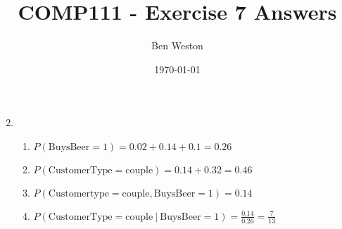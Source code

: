 \documentclass{article}
\title{COMP111 - Exercise 7 Answers}
\author{Ben Weston}
\date{\today}
\begin{document}
\maketitle
\begin{enumerate}\setcounter{enumi}{1}
        \item
                \begin{enumerate}
                        \item $P(\text{BuysBeer}=1)=0.02+0.14+0.1=0.26$
                        \item $P(\text{CustomerType}=\text{couple})=0.14+0.32=0.46$
                        \item $P(\text{Customertype}=\text{couple},\text{BuysBeer}=1)=0.14$
                        \item $P(\text{CustomerType}=\text{couple}\ |\ \text{BuysBeer}=1)=\frac{0.14}{0.26}=\frac{7}{13}$
                \end{enumerate}
\end{enumerate}
\end{document}
